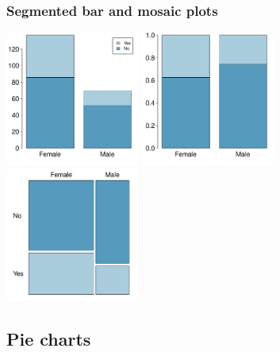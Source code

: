 \begin{frame}
\frametitle{Segmented bar and mosaic plots}


\begin{center}
\includegraphics[width=0.33\textwidth]{2-2_categorical_data/figures/gender_spouse/gender_seg_bar}
\includegraphics[width=0.33\textwidth]{2-2_categorical_data/figures/gender_spouse/gender_rel_seg_bar}
\includegraphics[width=0.33\textwidth]{2-2_categorical_data/figures/gender_spouse/gender_mosaic}
\end{center}

\end{frame}


\subsection{Pie charts}


